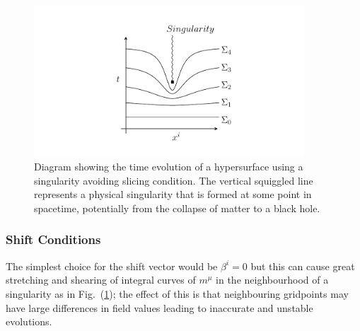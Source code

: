 \begin{figure}[h!]
    \includegraphics[width=0.9\textwidth]{png/slicing.pdf}
      \caption{Diagram showing the time evolution of a hypersurface using a singularity avoiding slicing condition. The vertical squiggled line represents a physical singularity that is formed at some point in spacetime, potentially from the collapse of matter to a black hole.} \label{nr:fig:singularity_avoiding}
\end{figure}


\subsubsection{Shift Conditions}

The simplest choice for the shift vector would be $\beta^i=0$ but this can cause great stretching and shearing of integral curves of $m^\mu$ in the neighbourhood of a singularity as in Fig.~(\ref{nr:fig:singularity_avoiding}); the effect of this is that neighbouring gridpoints may have large differences in field values leading to inaccurate and unstable evolutions.

